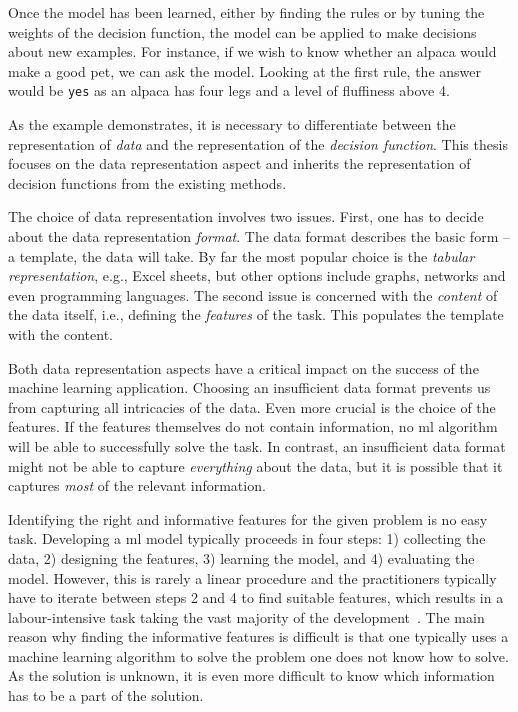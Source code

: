 Once the model has been learned, either by finding the rules or by tuning the weights of the decision function, the model can be applied to make decisions about new examples.
For instance, if we wish to know whether an alpaca would make a good pet, we can ask the model.
Looking at the first rule, the answer would be \texttt{yes} as an alpaca has four legs and a level of fluffiness above 4.



As the example demonstrates, it is necessary to differentiate between the representation of \textit{data} and the representation of  the \textit{decision function}.
This thesis focuses on the data representation aspect and inherits the representation of decision functions from the existing methods.





The choice of data representation involves two issues.
First, one has to decide about the data representation \textit{format}.
The data format describes the basic form -- a template, the data will take.
By far the most popular choice is the \textit{tabular representation}, e.g., Excel sheets, but other options include graphs, networks and even programming languages.
The second issue is concerned with the \textit{content} of the data itself, i.e., defining the \textit{features} of the task.
This populates the template with the content.



Both data representation aspects have a critical impact on the success of the machine learning application.
Choosing an insufficient data format prevents us from capturing all intricacies of the data.
Even more crucial is the choice of the features.
If the features themselves do not contain information, no \gls{ml} algorithm will be able to successfully solve the task.
In contrast, an insufficient data format might not be able to capture \textit{everything} about the data, but it is possible that it captures \textit{most} of the relevant information.



Identifying the right and informative features for the given problem is no easy task.
Developing a \gls{ml} model typically proceeds in four steps: 1) collecting the data, 2) designing the features, 3) learning the model, and 4) evaluating the model.
However, this is rarely a linear procedure and the practitioners typically have to iterate between steps 2 and 4 to find suitable features, which  results in a labour-intensive task taking the vast majority of the development~\cite{Wirth00crisp-dm:towards}.
The main reason why finding the informative features is difficult is that one typically uses a machine learning algorithm to solve the problem one does not know how to solve.
As the solution is unknown, it is even more difficult to know which information has to be a part of the solution.


